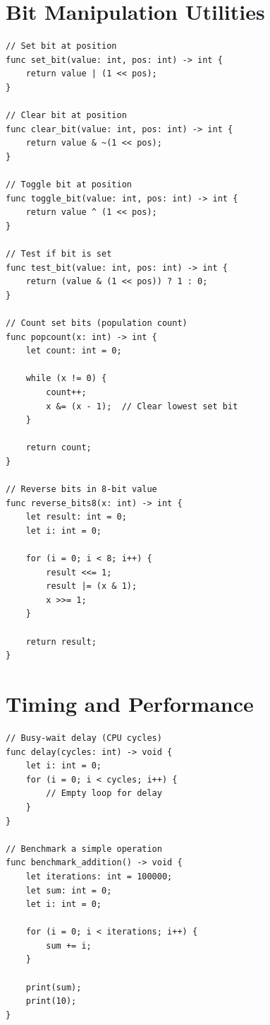 \documentclass[12pt,a4paper,oneside]{book}
\begin{document}
\section{Bit Manipulation Utilities}

\begin{lstlisting}[style=algo, caption={Bit Operations}]
// Set bit at position
func set_bit(value: int, pos: int) -> int {
    return value | (1 << pos);
}

// Clear bit at position
func clear_bit(value: int, pos: int) -> int {
    return value & ~(1 << pos);
}

// Toggle bit at position
func toggle_bit(value: int, pos: int) -> int {
    return value ^ (1 << pos);
}

// Test if bit is set
func test_bit(value: int, pos: int) -> int {
    return (value & (1 << pos)) ? 1 : 0;
}

// Count set bits (population count)
func popcount(x: int) -> int {
    let count: int = 0;
    
    while (x != 0) {
        count++;
        x &= (x - 1);  // Clear lowest set bit
    }
    
    return count;
}

// Reverse bits in 8-bit value
func reverse_bits8(x: int) -> int {
    let result: int = 0;
    let i: int = 0;
    
    for (i = 0; i < 8; i++) {
        result <<= 1;
        result |= (x & 1);
        x >>= 1;
    }
    
    return result;
}
\end{lstlisting}

\section{Timing and Performance}

\begin{lstlisting}[style=algo, caption={Simple Performance Measurement}]
// Busy-wait delay (CPU cycles)
func delay(cycles: int) -> void {
    let i: int = 0;
    for (i = 0; i < cycles; i++) {
        // Empty loop for delay
    }
}

// Benchmark a simple operation
func benchmark_addition() -> void {
    let iterations: int = 100000;
    let sum: int = 0;
    let i: int = 0;
    
    for (i = 0; i < iterations; i++) {
        sum += i;
    }
    
    print(sum);
    print(10);
}
\end{lstlisting}
\end{document}
